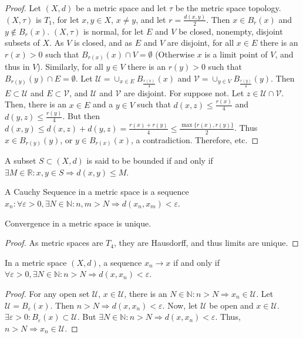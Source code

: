 \documentclass[crop=false,class=book,oneside]{standalone}
\begin{document}
            \begin{proof}
            Let $(X,d)$ be a metric space and let $\tau$ be the metric space topology. $(X,\tau)$ is $T_1$, for let $x,y\in X$, $x\ne y$, and let $r= \frac{d(x,y)}{2}$. Then $x\in B_{r}(x)$ and $y\notin B_{r}(x)$. $(X,\tau)$ is normal, for let $E$ and $V$ be closed, nonempty, disjoint subsets of $X$. As $V$ is closed, and as $E$ and $V$ are disjoint, for all $x\in E$ there is an $r(x)>0$ such that $B_{r(x)}(x)\cap V = \emptyset$ (Otherwise $x$ is a limit point of $V$, and thus in $V$). Similarly, for all $y\in V$ there is an $r(y)>0$ such that $B_{r(y)}(y)\cap E = \emptyset$. Let $\mathcal{U} = \cup_{x\in E}B_{\frac{r(x)}{4}}(x)$ and $\mathcal{V} = \cup_{y\in V}B_{\frac{r(y)}{4}}(y)$. Then $E\subset \mathcal{U}$ and $E\subset \mathcal{V}$, and $\mathcal{U}$ and $\mathcal{V}$ are disjoint. For suppose not. Let $z\in \mathcal{U}\cap \mathcal{V}$. Then, there is an $x\in E$ and a $y\in V$ such that $d(x,z)\leq \frac{r(x)}{4}$ and $d(y,z)\leq \frac{r(y)}{4}$. But then $d(x,y) \leq d(x,z)+d(y,z) = \frac{r(x)+r(y)}{4} \leq \frac{\max\{r(x),r(y)\}}{2}$. Thus $x\in B_{r(y)}(y)$, or $y\in B_{r(x)}(x)$, a contradiction. Therefore, etc.
            \end{proof}
            \begin{definition}
            A subset $S\subset (X,d)$ is said to be bounded if and only if $\exists M\in \mathbb{R}:x,y\in S\Rightarrow d(x,y)\leq M$.
            \end{definition}
            \begin{definition}
            A Cauchy Sequence in a metric space is a sequence $x_n:\forall \varepsilon>0,\exists N\in \mathbb{N}:n,m>N\Rightarrow d(x_n,x_m)<\varepsilon$.
            \end{definition}
            \begin{corollary}
            Convergence in a metric space is unique.
            \end{corollary}
            \begin{proof}
            As metric spaces are $T_4$, they are Hausdorff, and thus limits are unique.
            \end{proof}
            \begin{theorem}
            In a metric space $(X,d)$, a sequence $x_n\rightarrow x$ if and only if $\forall\varepsilon>0,\exists N\in \mathbb{N}:n>N\Rightarrow d(x,x_n)<\varepsilon$.
            \end{theorem}
            \begin{proof}
            For any open set $\mathcal{U}$, $x\in \mathcal{U}$, there is an $N\in \mathbb{N}:n>N\Rightarrow x_n \in \mathcal{U}$. Let $\mathcal{U}=B_{\varepsilon}(x)$. Then $n>N\Rightarrow d(x,x_n)<\varepsilon$. Now, let $\mathcal{U}$ be open and $x\in \mathcal{U}$. $\exists\varepsilon>0:B_{\varepsilon}(x)\subset \mathcal{U}$. But $\exists N\in \mathbb{N}:n>N\Rightarrow d(x,x_n)<\varepsilon$. Thus, $n>N\Rightarrow x_n\in \mathcal{U}$.
            \end{proof}
\end{document}
